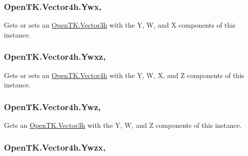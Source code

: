 \hypertarget{struct_open_t_k_1_1_vector4h_a730d6871722d88313025c4d61d5c1497}{
\subsubsection[{Ywx}]{ Open\-T\-K.\-Vector4h.\-Ywx\hspace{0.3cm}{\ttfamily [get]}, {\ttfamily [set]}}}\label{struct_open_t_k_1_1_vector4h_a730d6871722d88313025c4d61d5c1497}


Gets or sets an \hyperlink{struct_open_t_k_1_1_vector3h}{Open\-T\-K.\-Vector3h} with the Y, W, and X components of this instance. 

\hypertarget{struct_open_t_k_1_1_vector4h_acc038049fcbef772cd8096abdfb3a321}{
\subsubsection[{Ywxz}]{ Open\-T\-K.\-Vector4h.\-Ywxz\hspace{0.3cm}{\ttfamily [get]}, {\ttfamily [set]}}}\label{struct_open_t_k_1_1_vector4h_acc038049fcbef772cd8096abdfb3a321}


Gets or sets an \hyperlink{struct_open_t_k_1_1_vector4h}{Open\-T\-K.\-Vector4h} with the Y, W, X, and Z components of this instance. 

\hypertarget{struct_open_t_k_1_1_vector4h_af44b621e1b6ad109eded7daaf4059e7a}{
\subsubsection[{Ywz}]{ Open\-T\-K.\-Vector4h.\-Ywz\hspace{0.3cm}{\ttfamily [get]}, {\ttfamily [set]}}}\label{struct_open_t_k_1_1_vector4h_af44b621e1b6ad109eded7daaf4059e7a}


Gets an \hyperlink{struct_open_t_k_1_1_vector3h}{Open\-T\-K.\-Vector3h} with the Y, W, and Z components of this instance. 

\hypertarget{struct_open_t_k_1_1_vector4h_a1f3fcdc99dd4520b3bf63471b2a9cc16}{
\subsubsection[{Ywzx}]{ Open\-T\-K.\-Vector4h.\-Ywzx\hspace{0.3cm}{\ttfamily [get]}, {\ttfamily [set]}}}\label{struct_open_t_k_1_1_vector4h_a1f3fcdc99dd4520b3bf63471b2a9cc16}


